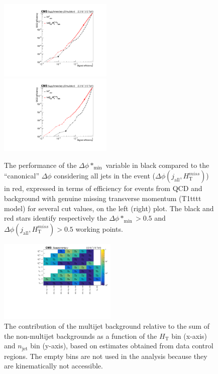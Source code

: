 \clearpage
\begin{figure}[tbhp]
    \caption{ 
    The performance of the $\Delta\phi*_{\mathrm{min}}$ variable in black compared to the ``canonical'' $\Delta\phi$ 
    considering all jets in the event ($\Delta\phi(j_{\mathrm{all}},H_{\mathrm{T}}^{miss})$) in red, 
    expressed in terms of efficiency for events from QCD and background with genuine missing transverse momentum (T1tttt model) 
    for several cut values, on the left (right) plot. 
    The black and red stars identify respectively the $\Delta\phi*_{\mathrm{min}}>0.5$ and $\Delta\phi(j_{\mathrm{all}},H_{\mathrm{T}}^{miss})>0.5$ working points. 
    \label{fig:bDPhi-ROC} }
  \begin{center}
     \includegraphics[width=0.48\textwidth]{ewk_ht800_aux} ~~
     \includegraphics[width=0.48\textwidth]{T1tttt_uncomp_ht800_aux}
  \end{center}
\end{figure}



\clearpage
\begin{figure}[tbhp]
    \caption{ 
    The contribution of the multijet background relative to the sum of
    the non-multijet backgrounds as a function of the $H_{\mathrm{T}}$
    bin (x-axis) and $n_{\mathrm{jet}}$ bin (y-axis), based on
    estimates obtained from data control regions. 
    The empty bins are not used in the analysis because they are
    kinematically not accessible.  
    \label{fig:qcd-rel-cont} }
  \begin{center}
     \includegraphics[width=0.5\textwidth]{QCDRelCont_aux}
  \end{center}
\end{figure}



